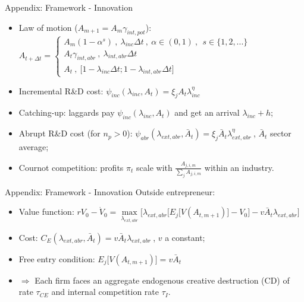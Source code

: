\documentclass[11pt]{beamer}
\begin{document}
\begin{frame}{Appendix: Framework - Innovation}
	\begin{itemize}\itemsep10pt	
	\item Law of motion ($A_{m+1} = A_m\gamma_{int, pot}$): $A_{t+\Delta t} =\begin{cases}
               A_m(1-\alpha^{s})\:,\: \lambda_{inc}\Delta t \:,\: \alpha \in (0,1)\:,\:\ s \in \{1, 2, ...\}\\
               A_t\gamma_{int,abr}\:,\: \lambda_{int,abr}\Delta t\\
               A_t \:, \: \big[1 - \lambda_{inc}\Delta t; 1 - \lambda_{int,abr}\Delta t\big] 
    \end{cases}$
	\item Incremental R\&D cost: $\psi_{inc}(\lambda_{inc}, A_{t}) = \xi_j A_t \lambda_{inc}^{\eta}$
	\item Catching-up: laggards pay $\psi_{inc}(\lambda_{inc}, A_{t})$ and get an arrival $\lambda_{inc} + h$;
	\item Abrupt R\&D cost (for $n_p > 0$): $\psi_{abr}(\lambda_{ext,abr}, \bar{A}_{t}) = \xi_j \bar{A}_t \lambda_{ext,abr}^{\eta}\:$, $\bar{A}_{t}$ sector average;
	\item Cournot competition: profits $\pi_t$ scale with $\frac{A_{j,i,m}}{\sum_{j}A_{j,i,m}}$ within an industry.
	\end{itemize}
\end{frame}

\begin{frame}{Appendix: Framework - Innovation}
Outside entrepreneur:
	\begin{itemize}\itemsep12pt	
	\item Value function: $rV_0 - \dot{V}_0 = \max\limits_{\lambda_{ext, abr}}\big[\lambda_{ext, abr}\big[E_j\big[V(A_{t, m+1})\big] - V_0\big] - v \bar{A}_{t}\lambda_{ext, abr}\big]$
 	\item Cost: $C_E(\lambda_{ext, abr}, \bar{A}_{t}) = v \bar{A}_{t} \lambda_{ext, abr}\:$, $v$ a constant;
	\item Free entry condition: $E_j\big[V(A_{t, m+1})\big] = v \bar{A}_{t}$
	\item $\Rightarrow$ Each firm faces an aggregate endogenous creative destruction (CD) of rate $\tau_{CE}$ and internal competition rate $\tau_I$.
	\end{itemize}
\end{frame}
\end{document}
